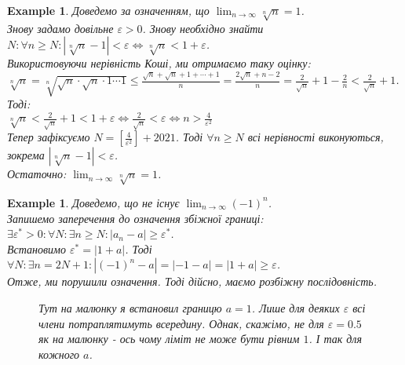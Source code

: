 \documentclass[a4paper, 14pt]{article}
\theoremstyle{theoremdd}
\theoremstyle{theoremdd}
\theoremstyle{theoremdd}
\theoremstyle{theoremdd}
\newtheorem{example}[theorem]{Example}
\theoremstyle{theoremdd}
\theoremstyle{theoremdd}
\theoremstyle{theoremdd}
\theoremstyle{theoremdd}
\begin{document}
	\begin{example}
	Доведемо за означенням, що $\displaystyle\lim_{n \to \infty} \sqrt[n]{n}=1$.\\
	Знову задамо довільне $\varepsilon > 0$. Знову необхідно знайти $\displaystyle N: \forall n \geq N: \left|\sqrt[n]{n}-1  \right|<\varepsilon \iff \sqrt[n]{n}<1+\varepsilon$.\\
	Використовуючи нерівність Коші, ми отримаємо таку оцінку:\\
	$\displaystyle \sqrt[n]{n}= \sqrt[n]{\sqrt{n}\cdot\sqrt{n}\cdot 1 \cdots 1} \leq \frac{\sqrt{n}+\sqrt{n}+1+\cdots+1}{n} = \frac{2\sqrt{n}+n-2}{n} = \frac{2}{\sqrt{n}}+1-\frac{2}{n}<\frac{2}{\sqrt{n}}+1$. Тоді:\\
	$\displaystyle \sqrt[n]{n} < \frac{2}{\sqrt{n}} + 1 < 1 + \varepsilon \iff \frac{2}{\sqrt{n}} < \varepsilon \iff n > \frac{4}{\varepsilon^2}$\\
	Тепер зафіксуємо $\displaystyle N = \left[\frac{4}{\varepsilon^2} \right] + 2021$. Тоді $\forall n \geq N$ всі нерівності виконуються, зокрема $\left|\sqrt[n]{n}-1  \right|<\varepsilon$.\\
	Остаточно: $\displaystyle\lim_{n \to \infty} \sqrt[n]{n}=1$.
	\end{example}
	
	\begin{example}
	Доведемо, що не існує $\displaystyle \lim_{n \to \infty} (-1)^n$.\\
	Запишемо заперечення до означення збіжної границі:\\
	$\exists \varepsilon^* > 0: \forall N: \exists n \geq N: |a_n - a| \geq \varepsilon^*$.\\
	Встановимо $\varepsilon^* = |1+a|$. Тоді $\forall N: \exists n = 2N+1 : |(-1)^n - a|= |-1-a| = |1+a| \geq \varepsilon$.\\
	Отже, ми порушили означення. Тоді дійсно, маємо розбіжну послідовність.
\begin{figure}[H]
\centering
\resizebox{0.5\textwidth}{!} {
}
\caption*{Тут на малюнку я встановил границю $a=1$. Лише для деяких $\varepsilon$ всі члени потраплятимуть всередину. Однак, скажімо, не для $\varepsilon = 0.5$ як на малюнку - ось чому ліміт не може бути рівним $1$. І так для кожного $a$.}
\end{figure}
	\end{example}
\end{document}
